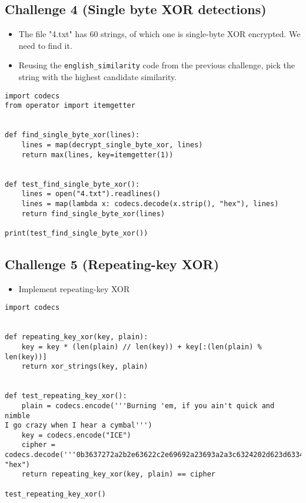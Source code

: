 \documentclass[11pt]{article}
\begin{document}
\subsection{Challenge 4 (Single byte XOR detections)}
\label{sec:org5d200e5}
\begin{itemize}
\item The file "4.txt" has 60 strings, of which one is single-byte XOR encrypted. We need to find it.
\item Reusing the \texttt{english\_similarity} code from the previous challenge, pick the string with the highest candidate similarity.
\end{itemize}
\begin{verbatim}
import codecs
from operator import itemgetter


def find_single_byte_xor(lines):
    lines = map(decrypt_single_byte_xor, lines)
    return max(lines, key=itemgetter(1))


def test_find_single_byte_xor():
    lines = open("4.txt").readlines()
    lines = map(lambda x: codecs.decode(x.strip(), "hex"), lines)
    return find_single_byte_xor(lines)

print(test_find_single_byte_xor())
\end{verbatim}

\subsection{Challenge 5 (Repeating-key XOR)}
\label{sec:org73734d1}
\begin{itemize}
\item Implement repeating-key XOR
\end{itemize}
\begin{verbatim}
import codecs


def repeating_key_xor(key, plain):
    key = key * (len(plain) // len(key)) + key[:(len(plain) % len(key))]
    return xor_strings(key, plain)


def test_repeating_key_xor():
    plain = codecs.encode('''Burning 'em, if you ain't quick and nimble
I go crazy when I hear a cymbal''')
    key = codecs.encode("ICE")
    cipher = codecs.decode('''0b3637272a2b2e63622c2e69692a23693a2a3c6324202d623d63343c2a26226324272765272a282b2f20430a652e2c652a3124333a653e2b2027630c692b20283165286326302e27282f''', "hex")
    return repeating_key_xor(key, plain) == cipher

test_repeating_key_xor()
\end{verbatim}
\end{document}
